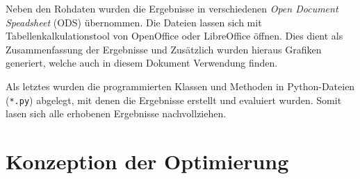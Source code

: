 Neben den Rohdaten wurden die Ergebnisse in verschiedenen \textit{Open Document Speadsheet} (ODS) übernommen. Die Dateien lassen sich mit Tabellenkalkulationstool von OpenOffice oder LibreOffice öffnen. Dies dient als Zusammenfassung der Ergebnisse und Zusätzlich wurden hieraus Grafiken generiert, welche auch in diesem Dokument Verwendung finden.\vspace{0.2cm}

Als letztes wurden die programmierten Klassen und Methoden in Python-Dateien (\texttt{*.py}) abgelegt, mit denen die Ergebnisse erstellt und evaluiert wurden. Somit lasen sich alle erhobenen Ergebnisse nachvollziehen.



\section{Konzeption der Optimierung}




